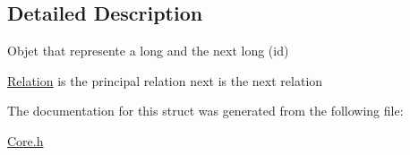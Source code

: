 \subsection{Detailed Description}
Objet that represente a long and the next long (id) 

\hyperlink{structRelation}{Relation} is the principal relation next is the next relation 

The documentation for this struct was generated from the following file\-:\begin{DoxyCompactItemize}
\item 
\hyperlink{Core_8h}{Core.\-h}\end{DoxyCompactItemize}
